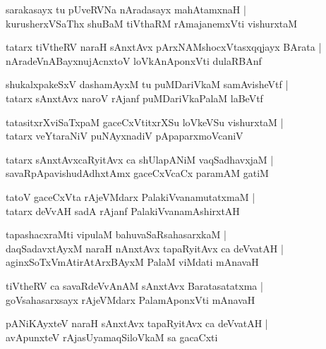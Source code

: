\documentclass[twoside,12pt,openright]{book}
\newcounter{shloka}[chapter]
\begin{document}
\begin{shloka}
sarakasayx tu pUveRVNa nAradasayx mahAtamxnaH |\\
kurusherxVSaThx shuBaM tiVthaRM rAmajanemxVti vishurxtaM 
\end{shloka}

\begin{shloka}
tatarx tiVtheRV naraH sAnxtAvx pArxNAMshocxVtasxqqjayx BArata |\\
nAradeVnABayxnujAcnxtoV loVkAnAponxVti dulaRBAnf  
\end{shloka}

\begin{shloka}
shukalxpakeSxV dashamAyxM tu  puMDariVkaM samAvisheVtf |\\
tatarx sAnxtAvx naroV rAjanf puMDariVkaPalaM laBeVtf
\end{shloka}

\begin{shloka}
tatasitxrXviSaTxpaM gaceCxVtitxrXSu loVkeVSu vishurxtaM |\\
tatarx veYtaraNiV puNAyxnadiV pApaparxmoVcaniV 
\end{shloka}

\begin{shloka}
tatarx sAnxtAvxcaRyitAvx ca shUlapANiM vaqSadhavxjaM |\\
savaRpApavishudAdhxtAmx gaceCxVcaCx paramAM gatiM 
\end{shloka}

\begin{shloka}
tatoV gaceCxVta rAjeVMdarx PalakiVvanamutatxmaM |\\
tatarx deVvAH sadA rAjanf PalakiVvanamAshirxtAH 
\end{shloka}

\begin{shloka}
tapashacxraMti vipulaM bahuvaSaRsahasarxkaM |\\
daqSadavxtAyxM naraH nAnxtAvx tapaRyitAvx ca deVvatAH |\\
aginxSoTxVmAtirAtArxBAyxM PalaM viMdati mAnavaH 
\end{shloka}

\begin{shloka}
tiVtheRV ca savaRdeVvAnAM sAnxtAvx Baratasatatxma |\\
goVsahasarxsayx rAjeVMdarx PalamAponxVti mAnavaH
\end{shloka}

\begin{shloka}
pANiKAyxteV naraH sAnxtAvx tapaRyitAvx ca deVvatAH |\\
avApunxteV rAjasUyamaqSiloVkaM sa gacaCxti 
\end{shloka}
\end{document}
